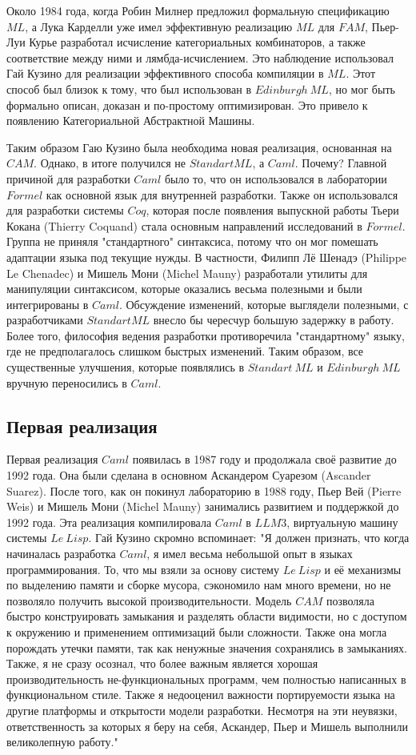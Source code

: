 \documentclass[14pt]{matmex-diploma-custom}
\begin{document}
Около 1984 года, когда Робин Милнер предложил формальную спецификацию $M\!L$, а Лука Карделли уже имел эффективную реализацию $M\!L$ для $FAM$, Пьер-Луи Курье разработал исчисление категориальных комбинаторов, а также соответствие между ними и лямбда-исчислением. Это наблюдение использовал Гай Кузино для реализации эффективного способа компиляции в $M\!L$. Этот способ был близок к тому, что был использован в $Edinburgh\ M\!L$, но мог быть формально описан, доказан и по-простому оптимизирован. Это привело к появлению Категориальной Абстрактной Машины. 

Таким образом Гаю Кузино была необходима новая реализация, основанная на $CAM$. Однако, в итоге получился не $Standart ML$, а $Caml$. Почему? Главной причиной для разработки $Caml$ было то, что он использовался в лаборатории $Formel$ как основной язык для внутренней разработки. Также он использовался для разработки системы $Coq$, которая после появления выпускной работы Тьери Кокана (Thierry Coquand) стала основным направлений исследований в $Formel$. Группа не приняля  "стандартного" синтаксиса, потому что он мог помешать адаптации языка под текущие нужды. В частности, Филипп Лё Шенадэ (Philippe Le Chenadec) и Мишель Мони (Michel Mauny) разработали утилиты для манипуляции синтаксисом, которые оказались весьма полезными и были интегрированы в $Caml$. Обсуждение изменений, которые выглядели полезными, с разработчиками $Standart ML$ внесло бы чересчур большую задержку в работу. Более того, философия ведения разработки противоречила "стандартному" языку, где не предполагалось слишком быстрых изменений. Таким образом, все существенные улучшения, которые появлялись в $Standart\ ML$ и $Edinburgh\ ML$ вручную переносились в $Caml$.

\subsection{Первая реализация}
Первая реализация $Caml$ появилась в 1987 году и продолжала своё развитие до 1992 года. Она были сделана в основном Аскандером Суарезом (Ascander Suarez). После того, как он покинул лабораторию в 1988 году, Пьер Вей (Pierre Weis) и Мишель Мони (Michel Mauny) занимались развитием и поддержкой до 1992 года. Эта реализация компилировала $Caml$ в  $LLM3$, виртуальную машину системы $Le\ Lisp$. Гай Кузино скромно вспоминает: "Я должен признать, что когда начиналась разработка $Caml$, я имел весьма небольшой опыт в языках программирования. То, что мы взяли за основу систему $Le\ Lisp$ и её механизмы по выделению памяти и сборке мусора, сэкономило нам много времени, но не позволяло получить высокой производительности. Модель $CAM$ позволяла быстро конструировать замыкания и разделять области видимости, но с доступом к окружению и применением оптимизаций были сложности. Также она могла порождать утечки памяти, так как ненужные значения сохранялись в замыканиях. Также, я не сразу осознал, что более важным является хорошая производительность не-функциональных программ, чем полностью  написанных в функциональном стиле. Также я недооценил важности портируемости языка на другие платформы и открытости модели разработки. Несмотря на эти неувязки, ответственность за которых я беру на себя, Аскандер, Пьер и Мишель выполнили великолепную работу."
\end{document}
